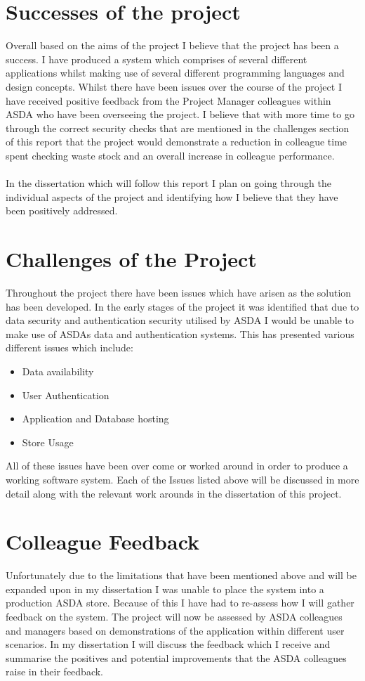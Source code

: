 \documentclass[a4paper,11pt]{report}
\begin{document}
\section {Successes of the project}
Overall based on the aims of the project I believe that the project has been a success. I have produced a system which comprises of several different applications whilst making use of several different programming languages and design concepts. 
 Whilst there have been issues over the course of the project I have received positive feedback from the Project Manager colleagues within ASDA who have been overseeing the project.
I believe that with more time to go through the correct security checks that are mentioned in the challenges section of this report that the project would demonstrate a reduction in 
colleague time spent checking waste stock and an overall increase in colleague performance. 
\\
\\
In the dissertation which will follow this report I plan on going through the individual aspects of the project and identifying how I believe that they have been positively addressed.

\section {Challenges of the Project}
Throughout the project there have been issues which have arisen as the solution has been developed. In the early stages of the project it was identified that due to data security and authentication security utilised by ASDA I would be unable to make use of ASDAs data and authentication systems. This has presented various different issues which include:
\begin{itemize}
    \item Data availability
    \item User Authentication
    \item Application and Database hosting
    \item Store Usage
\end{itemize}

All of these issues have been over come or worked around in order to produce a working software system. Each of the Issues listed above will be discussed in more detail along with the relevant work arounds in the dissertation of this project.


\section{Colleague Feedback}
Unfortunately due to the limitations that have been mentioned above and will be expanded upon in my dissertation I was unable to place the system into a production ASDA store.
Because of this I have had to re-assess how I will gather feedback on the system. The project will now be assessed by ASDA colleagues and managers based on demonstrations of the application within different user scenarios. 
In my dissertation I will discuss the feedback which I receive and summarise the positives and potential improvements that the ASDA colleagues raise in their feedback.
\end{document}
